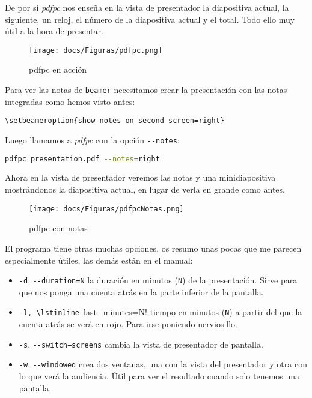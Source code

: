De por sí \emph{pdfpc} nos enseña en la vista de presentador la
diapositiva actual, la siguiente, un reloj, el número de la diapositiva
actual y el total. Todo ello muy útil a la hora de presentar.

\begin{figure}[htbp]
\centering
\texttt{[image: docs/Figuras/pdfpc.png]}
\caption{pdfpc en acción}
\end{figure}

Para ver las notas de \lstinline!beamer! necesitamos crear la
presentación con las notas integradas como hemos visto antes:

\begin{lstlisting}
\setbeameroption{show notes on second screen=right}
\end{lstlisting}

Luego llamamos a \emph{pdfpc} con la opción \lstinline!--notes!:

\begin{lstlisting}[language=bash]
pdfpc presentation.pdf --notes=right
\end{lstlisting}

Ahora en la vista de presentador veremos las notas y una minidiapositiva
mostrándonos la diapositiva actual, en lugar de verla en grande como
antes.

\begin{figure}[htbp]
\centering
\texttt{[image: docs/Figuras/pdfpcNotas.png]}
\caption{pdfpc con notas}
\end{figure}

El programa tiene otras muchas opciones, os resumo unas pocas que me
parecen especialmente útiles, las demás están en el manual:

\begin{itemize}
\item
  \lstinline!-d!, \lstinline!--duration=N! la duración en minutos
  (\lstinline!N!) de la presentación. Sirve para que nos ponga una
  cuenta atrás en la parte inferior de la pantalla.
\item
  \lstinline!-l, \lstinline!--last−minutes=N! tiempo en minutos
  (\lstinline!N!) a partir del que la cuenta atrás se verá en rojo. Para
  irse poniendo nerviosillo.
\item
  \lstinline!-s!, \lstinline!--switch−screens! cambia la vista de
  presentador de pantalla.
\item
  \lstinline!-w!, \lstinline!--windowed! crea dos ventanas, una con la
  vista del presentador y otra con lo que verá la audiencia. Útil para
  ver el resultado cuando solo tenemos una pantalla.
\end{itemize}

